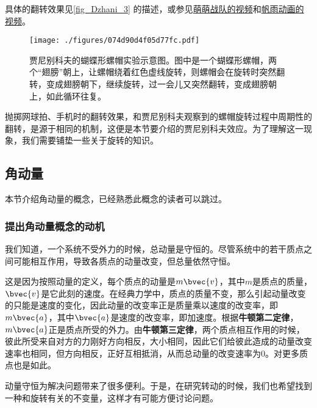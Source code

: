 具体的翻转效果见\autoref{fig_Dzhani_3} 的描述，或参见\href{https://www.bilibili.com/video/BV1jy4y1Y7CU/?share_source=copy_web&vd_source=5d336c88ab0583d823dccd3a9651b27b}{萌萌战队的视频}和\href{https://www.bilibili.com/video/BV12K411S7Gc/?spm_id_from=333.337.search-card.all.click&vd_source=0ae31f148e26bb548391e861d5f13610}{帆雨动画的视频}。


\begin{figure}[ht]
\centering
\texttt{[image: ./figures/074d90d4f05d77fc.pdf]}
\caption{贾尼别科夫的蝴蝶形螺帽实验示意图。图中是一个蝴蝶形螺帽，两个“翅膀”朝上，让螺帽绕着红色虚线旋转，则螺帽会在旋转时突然翻转，变成翅膀朝下，继续旋转，过一会儿又突然翻转，变成翅膀朝上，如此循环往复。} \label{fig_Dzhani_3}
\end{figure}



抛掷网球拍、手机时的翻转效果，和贾尼别科夫观察到的螺帽旋转过程中周期性的翻转，是源于相同的机制，这便是本节要介绍的贾尼别科夫效应。为了理解这一现象，我们需要铺垫一些关于旋转的知识。





\subsection{角动量}



本节介绍角动量的概念，已经熟悉此概念的读者可以跳过。


\subsubsection{提出角动量概念的动机}


我们知道，一个系统不受外力的时候，总动量是守恒的。尽管系统中的若干质点之间可能相互作用，导致各质点的动量改变，但总量依然守恒。

这是因为按照动量的定义，每个质点的动量是$m\bvec{v}$，其中$m$是质点的质量，$\bvec{v}$是它此刻的速度。在经典力学中，质点的质量不变，那么引起动量改变的只能是速度的变化，因此动量的改变率正是质量乘以速度的改变率，即$m\bvec{a}$，其中$\bvec{a}$是速度的改变率，即加速度。根据\textbf{牛顿第二定律}，$m\bvec{a}$正是质点所受的外力。由\textbf{牛顿第三定律}，两个质点相互作用的时候，彼此所受来自对方的力刚好方向相反，大小相同，因此它们给彼此造成的动量改变速率也相同，但方向相反，正好互相抵消，从而总动量的改变速率为$0$。对更多质点也是如此。


动量守恒为解决问题带来了很多便利。于是，在研究转动的时候，我们也希望找到一种和旋转有关的不变量，这样才有可能方便讨论问题。


